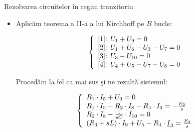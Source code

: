 \documentclass[a4paper]{article}
\begin{document}
\begin{section}{Rezolvarea circuitelor \^ in regim tranzitoriu \\[0.5cm]}
\begin{itemize}
	\^ Inlocuind cu valorile cunoscute \c si trec\^ and necunoscutele \^ in membrul drept, ob\c tinem sistemul: 

 	\begin{large} \[ \left\{ \begin{array}{ll}
		{I}_5 + {I}_8 + {I}_{10} = \frac{{J}_1}{s} \\
		{I}_3 - {I}_8 - {I}_9 - {I}_{10}  = 0 \\		
		{I}_4 + {I}_9 = 0 \\
		{I}_4 = -\frac{{J}_2}{s}\\		
		{I}_2 + {I}_3 =  \frac{{J}_2}{s} \\
	\end{array} \right. \] \end{large}

	\item Aplic\u am teorema a II-a a lui Kirchhoff pe $ B $ bucle:

	 \begin{large} \[ \left\{ \begin{array}{ll}
		$[1]: $ {U}_1 + {U}_9 = 0 \\
		$[2]: $ {U}_1 + {U}_6 - {U}_3 - U_7  = 0 \\
		$[3]: $ {U}_3 - {U}_{10} = 0 \\
		$[4]: $ {U}_4 + {U}_5 - {U}_7 - {U}_8 = 0 \\
	\end{array} \right. \] \end{large}

	Proced\u am la fel ca mai sus \c si ne rezult\u a sistemul:

	 \begin{large} \[ \left\{ \begin{array}{ll}
		{R_1} \cdot {I}_5 + {U}_9 = 0 \\
		{R_1} \cdot {I}_5 - {R_2} \cdot {I}_8 - {R_4} \cdot {I}_3 = -\frac{E_2}{s} \\
		{R_2} \cdot {I}_8 - \frac{1}{sC} \cdot {I}_{10} =  0 \\
		({R_3} + sL) \cdot {I}_9 + {U}_5 - {R_4} \cdot \underline{I}_3 = \frac{E_3}{s} \\ \par
	\end{array} \right. \] \end{large}
	

\end{itemize}
\end{section}
\end{document}

